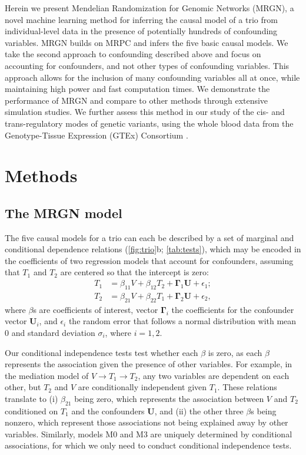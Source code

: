 \documentclass[12pt,letterpaper]{report}
\newcommand{\betaoneone}{\beta_{11}}
\newcommand{\betaonetwo}{\beta_{12}}
\newcommand{\betatwoone}{\beta_{21}}
\newcommand{\betatwotwo}{\beta_{22}}
\newcommand{\boldGamma}{\boldsymbol \Gamma}
\newcommand{\boldU}{\boldsymbol U}
\begin{document}
\begin{doublespace}
Herein we present Mendelian Randomization for Genomic Networks (MRGN), 
a novel machine learning method for inferring the causal model of a trio from individual-level data in the presence of potentially hundreds of confounding variables.  MRGN builds on MRPC and infers the five basic causal models.   We take the second approach to confounding described above and focus on accounting for confounders, and not other types of confounding variables.  This approach allows for the inclusion of many confounding variables all at once, while maintaining high power and fast computation times. We demonstrate the performance of MRGN and compare to other methods through extensive simulation studies.  We further assess this method in our study of the cis- and trans-regulatory modes of genetic variants, using the whole blood data from the Genotype-Tissue Expression (GTEx) Consortium \cite{gtex2020}. 

\section{Methods}
\subsection{The MRGN model}

The five causal models for a trio can each be described by a set of marginal and conditional dependence relations (\autoref{fig:trio}b; \autoref{tab:tests}), which may be encoded in the coefficients of two regression models that account for confounders, assuming that $T_1$ and $T_2$ are centered so that the intercept is zero:
\begin{align}
	T_1 &= \betaoneone V+\betaonetwo T_2+\boldGamma_1 \boldU+ \epsilon_1; \label{eq:reg1} \\
	T_2 &= \betatwoone V+\betatwotwo T_1+\boldGamma_2 \boldU+ \epsilon_2, \label{eq:reg2}
\end{align}
where $\beta$s are coefficients of interest, vector $\boldGamma_i$ the coefficients for the confounder vector $\boldU_i$, and $\epsilon_i$ the random error that follows a normal distribution with mean 0 and standard deviation $\sigma_i$, where $i=1, 2$.  

Our conditional independence tests test whether each $\beta$ is zero, as each $\beta$ represents the association given the presence of other variables.  For example, in the mediation model of $V \rightarrow T_1 \rightarrow T_2$, any two variables are dependent on each other, but $T_2$ and $V$ are conditionally independent given $T_1$.  These relations translate to (i) $\betatwoone$ being zero, which represents the association between $V$ and $T_2$ conditioned on $T_1$ and the confounders $\boldU$, and (ii) the other three $\beta$s being nonzero, which represent those associations not being explained away by other variables.  Similarly, models M0 and M3 are uniquely determined by conditional associations, for which we only need to conduct conditional independence tests.


\end{doublespace}
\end{document}
